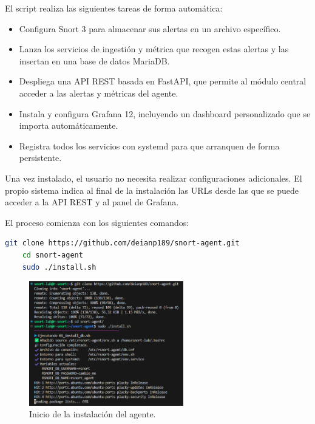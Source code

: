 \documentclass[11pt,a4paper,twoside]{report}
\begin{document}
El script realiza las siguientes tareas de forma automática:

\begin{itemize}
	\item Configura Snort 3 para almacenar sus alertas en un archivo específico.
	\item Lanza los servicios de ingestión y métrica que recogen estas alertas y las insertan en una base de datos MariaDB.
	\item Despliega una API REST basada en FastAPI, que permite al módulo central acceder a las alertas y métricas del agente.
	\item Instala y configura Grafana 12, incluyendo un dashboard personalizado que se importa automáticamente.
	\item Registra todos los servicios con systemd para que arranquen de forma persistente.
\end{itemize}

Una vez instalado, el usuario no necesita realizar configuraciones adicionales. El propio sistema indica al final de la instalación las URLs desde las que se puede acceder a la API REST y al panel de Grafana.\newline

El proceso comienza con los siguientes comandos:

\begin{lstlisting}[language=bash, caption={Comandos de instalación del agente}, label={lst:instalacion-snort-agent}]
	git clone https://github.com/deianp189/snort-agent.git
	cd snort-agent
	sudo ./install.sh
\end{lstlisting}

\begin{figure}[H]
	\centering
	\includegraphics[width=0.6\textwidth]{install/4.png}
	\caption{Inicio de la instalación del agente.}
	\label{fig:inicio-snort-agent}
\end{figure}
\end{document}
